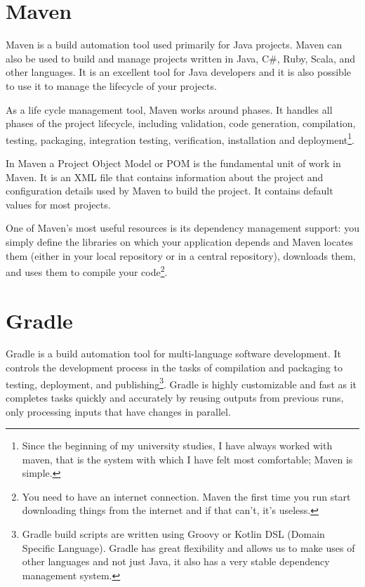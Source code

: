 \documentclass[a4paper,11pt]{article}
\begin{document}
\section{Maven}
Maven is a build automation tool used primarily for Java projects. Maven can 
also be used to build and manage projects written in Java, C\#, Ruby, Scala, 
and other languages\cite{Maven}. It is an excellent tool for Java developers 
and it is also possible to use it to manage the lifecycle of your projects.

As a life cycle management tool, Maven works around phases. It handles all 
phases of the project lifecycle, including validation, code generation, 
compilation, testing, packaging, integration testing, verification, 
installation and deployment\footnote{Since the beginning of my university 
studies, I have always worked with maven, that is the system with which I have 
felt most comfortable; Maven is simple.}.

In Maven a Project Object Model or POM is the fundamental unit of work in Maven.
It is an XML file that contains information about the project and configuration
details used by Maven to build the project. It contains default values for most
projects\cite{Apache}.

One of Maven's most useful resources is its dependency management support: you 
simply define the libraries on which your application depends and Maven locates
them (either in your local repository or in a central repository), downloads 
them, and uses them to compile your code\footnote{You need to have an internet 
connection.  Maven the first time you run start downloading things from the 
internet and if that can't, it's useless.}.

\section{Gradle}
Gradle is a build automation tool for multi-language software development. It 
controls the development process in the tasks of compilation and packaging to 
testing, deployment, and publishing\cite{Gradle}\footnote{Gradle build scripts 
are written using Groovy or Kotlin DSL (Domain Specific Language). Gradle has 
great flexibility and allows us to make uses of other languages and not just 
Java, it also has a very stable dependency management system.}. Gradle is 
highly customizable and fast as it completes tasks quickly and accurately by 
reusing outputs from previous runs, only processing inputs that have changes 
in parallel.
\end{document}

